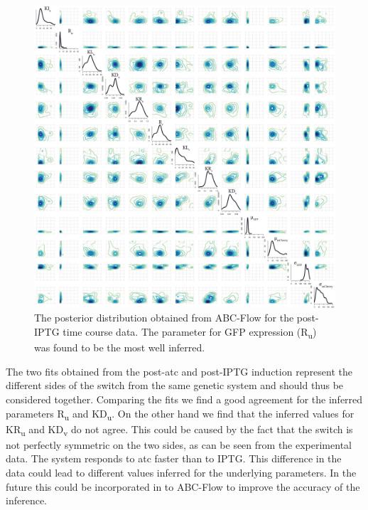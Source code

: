 \begin{figure}[htbp]
\centerfloat
	\includegraphics[width=1.1\textwidth]{../../chapters/chapterABCFlow/images/posterior_iptg.png}
	\caption[Posterior distribution of inferred parameters for post-IPTG induction of the toggle switch]{\label{fig:1atc-post} The posterior distribution obtained from ABC-Flow for the post-IPTG time course data. The parameter for GFP expression (R\textsubscript{u}) was found to be the most well inferred.}
\end{figure}

The two fits obtained from the post-\acrshort{atc} and post-IPTG induction represent the different sides of the switch from the same genetic system and should thus be considered together. Comparing the fits we find a good agreement for the inferred parameters R\textsubscript{u} and KD\textsubscript{u}. On the other hand we find that the inferred values for KR\textsubscript{u} and KD\textsubscript{v} do not agree. This could be caused by the fact that the switch is not perfectly symmetric on the two sides, as can be seen from the experimental data. The system responds to \acrshort{atc} faster than to IPTG. This difference in the data could lead to different values inferred for the underlying parameters. In the future this could be incorporated in to ABC-Flow to improve the accuracy of the inference.



